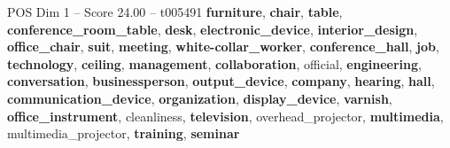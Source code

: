 \begin{textsample}{POS Dim 1 – Score 24.00 – t005491}  \label{ex:f1_pos_030}
\textbf{furniture}, \textbf{chair}, \textbf{table}, \textbf{conference\_room\_table}, \textbf{desk}, \textbf{electronic\_device}, \textbf{interior\_design}, \textbf{office\_chair}, \textbf{suit}, \textbf{meeting}, \textbf{white-collar\_worker}, \textbf{conference\_hall}, \textbf{job}, \textbf{technology}, \textbf{ceiling}, \textbf{management}, \textbf{collaboration}, official, \textbf{engineering}, \textbf{conversation}, \textbf{businessperson}, \textbf{output\_device}, \textbf{company}, \textbf{hearing}, \textbf{hall}, \textbf{communication\_device}, \textbf{organization}, \textbf{display\_device}, \textbf{varnish}, \textbf{office\_instrument}, cleanliness, \textbf{television}, overhead\_projector, \textbf{multimedia}, multimedia\_projector, \textbf{training}, \textbf{seminar}

\end{textsample}
